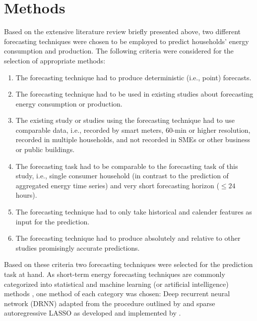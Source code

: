 
\section{Methods}\label{Sec:Method}

Based on the extensive literature review briefly presented above, two different forecasting techniques were chosen to be employed to predict households' energy consumption and production. The following criteria were considered for the selection of appropriate methods: 

\begin{enumerate}
    \item The forecasting technique had to produce deterministic (i.e., point) forecasts.
    \item The forecasting technique had to be used in existing studies about forecasting energy consumption or production.
    \item The existing study or studies using the forecasting technique had to use comparable data, i.e., recorded by smart meters, 60-min or higher resolution, recorded in multiple households, and not recorded in SMEs or other business or public buildings.
    \item The forecasting task had to be comparable to the forecasting task of this study, i.e., single consumer household (in contrast to the prediction of aggregated energy time series) and very short forecasting horizon ($\leq 24$ hours).
    \item The forecasting technique had to only take historical and calender features as input for the prediction.
    \item The forecasting technique had to produce absolutely and relative to other studies promisingly accurate predictions.
\end{enumerate}

\noindent Based on these criteria two forecasting techniques were selected for the prediction task at hand. As short-term energy forecasting techniques are commonly categorized into statistical and machine learning (or artificial intelligence) methods \citep{Bansal:2015,Diagne:2013,Gan:2017}, one method of each category was chosen: Deep recurrent neural network (DRNN) adapted from the procedure outlined by \citet{Shi:2017} and sparse autoregressive LASSO as developed and implemented by \citet{Li:2017}.%

